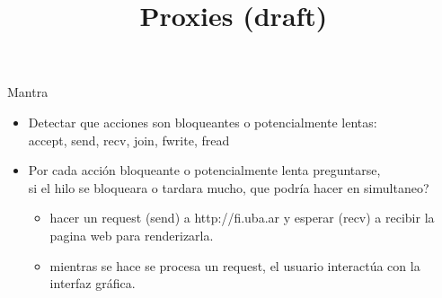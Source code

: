 

\title%
{Proxies (draft)}

\subject{Proxies (draft)}



%
%
%

\begin{frame}
   \titlepage
\end{frame}

\begin{frame}[fragile,label=M8]{Mantra}{}
   \begin{itemize}
      \item Detectar que acciones son bloqueantes o potencialmente lentas: \\
            accept, send, recv, join, fwrite, fread
      \item Por cada acci\'on bloqueante o potencialmente lenta preguntarse, \\
          si el hilo se bloqueara o tardara mucho, que podr\'ia hacer en simultaneo? 
       \begin{itemize}
           \item hacer un request (send) a http://fi.uba.ar y esperar (recv) a recibir la pagina web para renderizarla.
           \item mientras se hace se procesa un request, el usuario interact\'ua con la interfaz gr\'afica.
       \end{itemize}
   \end{itemize}
\end{frame}

